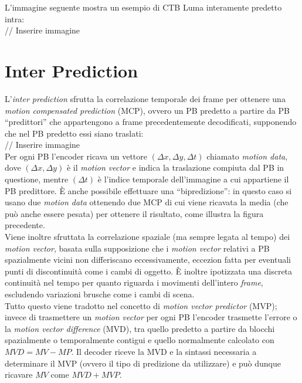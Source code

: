L'immagine seguente mostra un esempio di CTB Luma interamente predetto intra: \\

// Inserire immagine

\section{Inter Prediction}
L'\emph{inter prediction} sfrutta la correlazione temporale dei frame per 
ottenere una \emph{motion compensated prediction} (MCP), ovvero un PB predetto 
a partire da PB ``predittori'' che appartengono a frame precedentemente 
decodificati, supponendo che nel PB predetto essi siano traslati: 
\\
// Inserire immagine
\\
Per ogni PB l'encoder ricava un vettore ${(\Delta x,\Delta y,\Delta t)}$ 
chiamato \emph{motion data}, dove ${(\Delta x,\Delta y)}$ è il 
\emph{motion vector} e indica la traslazione compiuta dal PB in questione, 
mentre ${(\Delta t)}$ è l'indice temporale dell'immagine a cui appartiene il PB 
predittore.
È anche possibile effettuare una ``bipredizione'': in questo caso si usano 
due \emph{motion data} ottenendo due MCP di cui viene ricavata la media (che 
può anche essere pesata) per ottenere il risultato, come illustra la figura 
precedente.
\\
Viene inoltre sfruttata la correlazione spaziale (ma sempre legata al tempo) 
dei \emph{motion vector}, basata sulla supposizione che i \emph{motion vector} 
relativi a PB spazialmente vicini non differiscano eccessivamente, eccezion 
fatta per eventuali punti di discontinuità come i cambi di oggetto. È inoltre 
ipotizzata una discreta continuità nel tempo per quanto riguarda i movimenti 
dell'intero \emph{frame}, escludendo variazioni brusche come i cambi di scena.
\\
Tutto questo viene tradotto nel concetto di \emph{motion vector predictor} 
(MVP); invece di trasmettere un \emph{motion vector} per ogni PB l'encoder 
trasmette l'errore o la \emph{motion vector difference} (MVD), tra quello 
predetto a partire da blocchi spazialmente o temporalmente contigui e quello 
normalmente calcolato con $MVD=MV-MP$.
Il decoder riceve la MVD e la sintassi necessaria a determinare il MVP (ovvero 
il tipo di predizione da utilizzare) e può dunque ricavare $MV$ come $MVD+MVP$.
 
